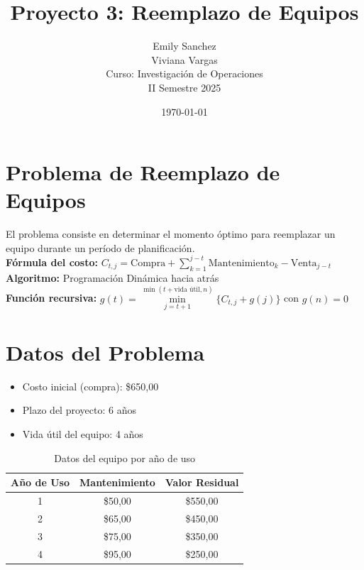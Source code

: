 \documentclass[12pt]{article}
\title{Proyecto 3: Reemplazo de Equipos}
\author{Emily Sanchez \\ Viviana Vargas \\[1cm] Curso: Investigación de Operaciones \\ II Semestre 2025}
\date{\today}
\begin{document}
\maketitle
\newpage
\section*{Problema de Reemplazo de Equipos}
El problema consiste en determinar el momento óptimo para reemplazar un equipo durante un período de planificación.\\
\textbf{Fórmula del costo:} $C_{t,j} = \text{Compra} + \sum_{k=1}^{j-t} \text{Mantenimiento}_k - \text{Venta}_{j-t}$\\
\textbf{Algoritmo:} Programación Dinámica hacia atrás\\
\textbf{Función recursiva:} $g(t) = \min\limits_{j=t+1}^{\min(t+\text{vida útil}, n)} \{C_{t,j} + g(j)\}$ con $g(n) = 0$\\

\section*{Datos del Problema}
\begin{itemize}
\item Costo inicial (compra): \$650,00
\item Plazo del proyecto: 6 años
\item Vida útil del equipo: 4 años
\end{itemize}

\begin{table}[H]
\centering
\caption{Datos del equipo por año de uso}
\begin{tabular}{ccc}
\toprule
Año de Uso & Mantenimiento & Valor Residual \\
\midrule
1 & \$50,00 & \$550,00 \\
2 & \$65,00 & \$450,00 \\
3 & \$75,00 & \$350,00 \\
4 & \$95,00 & \$250,00 \\
\bottomrule
\end{tabular}
\end{table}

\clearpage
\end{document}
